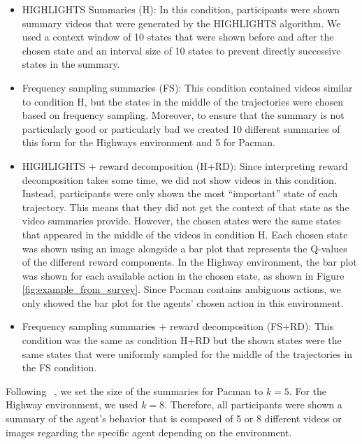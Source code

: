 \documentclass[runningheads]{llncs}
\begin{document}
\begin{itemize}
\item HIGHLIGHTS Summaries (H): In this condition, participants were shown summary videos that were generated by the HIGHLIGHTS algorithm.
We used a context window of 10 states that were shown before and after the chosen state and an interval size of 10 states to prevent directly successive states in the summary.

\item Frequency sampling summaries (FS): 
This condition contained videos similar to condition H, but the states in the middle of the trajectories were chosen based on frequency sampling. 
Moreover, to ensure that the summary is not particularly good or particularly bad we created 10 different summaries of this form for the Highways environment and 5 for Pacman.

\item HIGHLIGHTS + reward decomposition (H+RD): 
Since interpreting reward decomposition takes some time, we did not show videos in this condition.
Instead, participants were only shown the most ``important'' state of each trajectory.
This means that they did not get the context of that state as the video summaries provide.
However, the chosen states were the same states that appeared in the middle of the videos in condition H.
Each chosen state was shown using an image alongside a  bar plot that represents the Q-values of the different reward components. 
In the Highway environment, the bar plot was shown for each available action in the chosen state, as shown in Figure \ref{fig:example_from_survey}. 
Since Pacman contains ambiguous actions, we only showed the bar plot for the agents' chosen action in this environment.

\item Frequency sampling summaries + reward decomposition (FS+RD):
This condition was the same as condition H+RD but the shown states were the same states that were uniformly sampled for the middle of the trajectories in the FS condition.

\end{itemize}

Following ~\cite{huber2020local}, we set the size of the summaries for Pacman to $k=5$.
For the Highway environment, we used $k=8$.
Therefore, all participants were shown a summary of the agent's behavior that is composed of 5 or 8 different videos or images regarding the specific agent depending on the environment.
\end{document}
